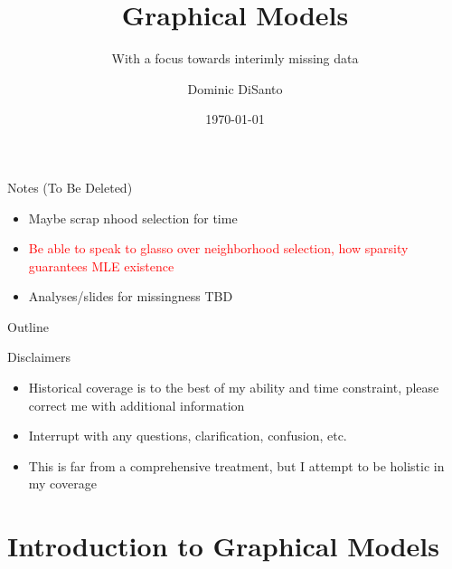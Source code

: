 \documentclass{beamer}
\title{Graphical Models}
\subtitle{With a focus towards interimly missing data}
\author{Dominic DiSanto}
\institute[]{Department of Biostatistics, Harvard University}
\date{\today}
\begin{document}
\begin{frame}{Notes (To Be Deleted)}
    \begin{itemize}
        \item Maybe scrap nhood selection for time 
        \item \textcolor{red}{Be able to speak to glasso over neighborhood selection, how sparsity guarantees MLE existence}
        \item Analyses/slides for missingness TBD 
    \end{itemize}
\end{frame}


\maketitle


\begin{frame}{Outline}
\tableofcontents 
\end{frame}

\begin{frame}{Disclaimers}
    \begin{itemize}\setlength\itemsep{8mm}
        \item Historical coverage is to the best of my ability and time constraint, please correct me with additional information
        \item Interrupt with any questions, clarification, confusion, etc. 
        \item This is far from a comprehensive treatment, but I attempt to be holistic in my coverage 
    \end{itemize}
\end{frame}

\section{Introduction to Graphical Models}
\end{document}
